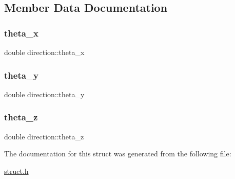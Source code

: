 \subsection{Member Data Documentation}
\mbox{\label{structdirection_a41c0703c5f8f2ed98a6d388ab7934443}} 
\subsubsection{\texorpdfstring{theta\+\_\+x}{theta\_x}}
{\footnotesize\ttfamily double direction\+::theta\+\_\+x}

\mbox{\label{structdirection_a2b953f3c2200ae6d4bfe92ddfeef471d}} 
\subsubsection{\texorpdfstring{theta\+\_\+y}{theta\_y}}
{\footnotesize\ttfamily double direction\+::theta\+\_\+y}

\mbox{\label{structdirection_add62492a9c4199b30f0df55ebf7f273b}} 
\subsubsection{\texorpdfstring{theta\+\_\+z}{theta\_z}}
{\footnotesize\ttfamily double direction\+::theta\+\_\+z}



The documentation for this struct was generated from the following file\+:\begin{DoxyCompactItemize}
\item 
\hyperlink{struct_8h}{struct.\+h}\end{DoxyCompactItemize}
